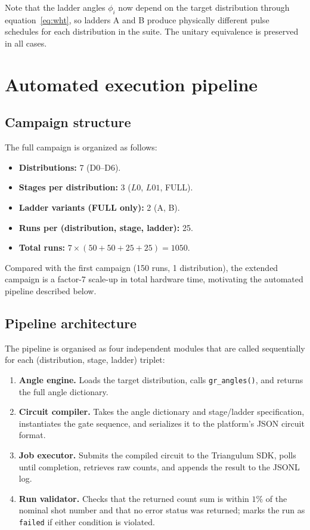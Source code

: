 \documentclass[11pt,a4paper]{article}
\begin{document}
Note that the ladder angles $\phi_i$ now depend on the target
distribution through equation~\eqref{eq:wht}, so ladders A and B
produce physically different pulse schedules for each distribution
in the suite. The unitary equivalence is preserved in all cases.

\section{Automated execution pipeline}
\label{sec:automation}

\subsection{Campaign structure}

The full campaign is organized as follows:

\begin{itemize}
  \item \textbf{Distributions:} 7 (D0--D6).
  \item \textbf{Stages per distribution:} 3 ($L0$, $L01$, FULL).
  \item \textbf{Ladder variants (FULL only):} 2 (A, B).
  \item \textbf{Runs per (distribution, stage, ladder):} 25.
  \item \textbf{Total runs:} $7 \times (50 + 50 + 25 + 25) = 1050$.
\end{itemize}

Compared with the first campaign (150 runs, 1 distribution), the
extended campaign is a factor-7 scale-up in total hardware time,
motivating the automated pipeline described below.

\subsection{Pipeline architecture}

The pipeline is organised as four independent modules that are
called sequentially for each (distribution, stage, ladder) triplet:

\begin{enumerate}[label=\arabic*.]
  \item \textbf{Angle engine.} Loads the target distribution,
    calls \texttt{gr\_angles()}, and returns the full angle dictionary.
  \item \textbf{Circuit compiler.} Takes the angle dictionary and
    stage/ladder specification, instantiates the gate sequence, and
    serializes it to the platform's JSON circuit format.
  \item \textbf{Job executor.} Submits the compiled circuit to the
    Triangulum SDK, polls until completion, retrieves raw counts,
    and appends the result to the JSONL log.
  \item \textbf{Run validator.} Checks that the returned count sum
    is within $1\%$ of the nominal shot number and that no
    error status was returned; marks the run as \texttt{failed}
    if either condition is violated.
\end{enumerate}
\end{document}
